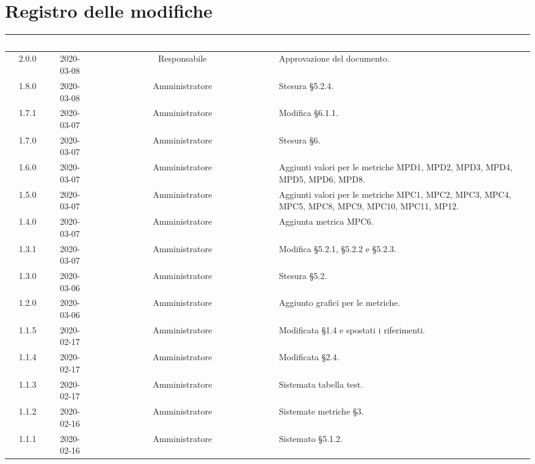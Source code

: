 \section*{Registro delle modifiche}
\setcounter{table}{-1}
{
\renewcommand{\arraystretch}{1.5}
\centering
\begin{longtable}{ c c  C{2.5cm} c c C{3.5cm}}
\textcolor{white}{\textbf{Versione}}&
\textcolor{white}{\textbf{Data}}&
\textcolor{white}{\textbf{Nominativo}}&
\textcolor{white}{\textbf{Ruolo}}&
\textcolor{white}{\textbf{Verificatore}}&
\textcolor{white}{\textbf{Descrizione}}\\	
\endhead

2.0.0 & 2020-03-08 & \LD{} & Responsabile & \LD{} & Approvazione del documento. \\
1.8.0 & 2020-03-08 & \PF{} & Amministratore & \AT{} & Stesura §5.2.4. \\
1.7.1 & 2020-03-07 & \DF{} & Amministratore & \SE{} & Modifica §6.1.1. \\
1.7.0 & 2020-03-07 & \CE{} & Amministratore & \SE{} & Stesura §6. \\
1.6.0 & 2020-03-07 & \CE{} & Amministratore & \AT{} & Aggiunti valori per le metriche MPD1, MPD2, MPD3, MPD4, MPD5, MPD6, MPD8. \\
1.5.0 & 2020-03-07 & \PF{} & Amministratore & \AT{} & Aggiunti valori per le metriche MPC1, MPC2, MPC3, MPC4, MPC5, MPC8, MPC9, MPC10, MPC11, MP12. \\
1.4.0 & 2020-03-07 & \DF{} & Amministratore & \AT{} & Aggiunta metrica MPC6. \\
1.3.1 & 2020-03-07 & \CE{} & Amministratore & \SE{} & Modifica §5.2.1, §5.2.2 e §5.2.3. \\
1.3.0 & 2020-03-06 & \PF{} & Amministratore & \AT{} & Stesura §5.2. \\
1.2.0 & 2020-03-06 & \PF{} & Amministratore & \SE{} & Aggiunto grafici per le metriche. \\
1.1.5 & 2020-02-17 & \CE{} & Amministratore & \AT{} & Modificata §1.4 e spostati i riferimenti. \\
1.1.4 & 2020-02-17 & \PF{} & Amministratore & \AT{} & Modificata §2.4. \\
1.1.3 & 2020-02-17 & \DF{} & Amministratore & \AT{} & Sistemata tabella test. \\
1.1.2 & 2020-02-16 & \CE{} & Amministratore & \SE{} & Sistemate metriche §3. \\
1.1.1 & 2020-02-16 & \PF{} & Amministratore & \AT{} & Sistemato §5.1.2. \\

\end{longtable}}
